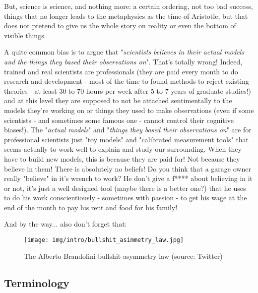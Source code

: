 	But, science is science, and nothing more: a certain ordering, not too bad success, things that no longer leads to the metaphysics as the time of Aristotle, but that does not pretend to give us the whole story on reality or even the bottom of visible things.
	\begin{center}
	\end{center}
	\begin{tcolorbox}[title=Remark,colframe=black,arc=10pt]
	A quite common bias is to argue that "\textit{scientists believes in their actual models and the things they based their observations on}". That's totally wrong! Indeed, trained and real scientists are professionals (they are paid every month to do research and development - most of the time to found methods to reject existing theories - at least 30 to 70 hours per week after 5 to 7 years of graduate studies!) and at this level they are supposed to not be attached sentimentally to the models they're working on or things they used to make observations (even if some scientists - and sometimes some famous one - cannot control their cognitive biases!). The "\textit{actual models}" and "\textit{things they based their observations on}" are for professional scientists just "toy models" and "calibrated measurement tools" that seems actually to work well to explain and study our surrounding. When they have to build new models, this is because they are paid for! Not because they believe in them! There is absolutely no beliefs! Do you think that a garage owner really "believe" in it's wrench to work? He don't give a f**** about believing in it or not, it's just a well designed tool (maybe there is a better one?) that he uses to do his work conscientiously - sometimes with passion - to get his wage at the end of the month to pay his rent and food for his family!
	\end{tcolorbox}
	And by the way... also don't forget that:
	\begin{figure}[H]
		\centering
		\texttt{[image: img/intro/bullshit\_asimmetry\_law.jpg]}
		\caption[The Alberto Brandolini bullshit asymmetry law]{The Alberto Brandolini bullshit asymmetry law (source: Twitter)}
	\end{figure}	

	\subsection{Terminology}

